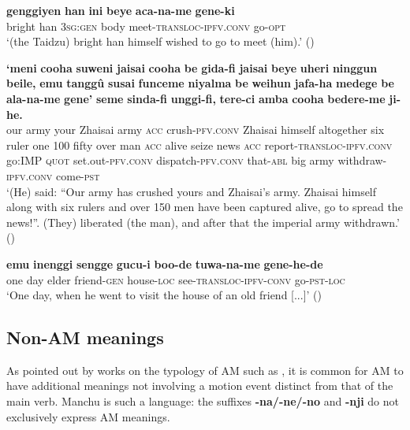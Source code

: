 \documentclass{article}
\newcommand{\ipa}[1]{\textbf{{\phon\mbox{#1}}}} %
\begin{document}
\begin{exe}
\ex \label{ex:acaname.geneki}
\gll
\ipa{genggiyen} 	\ipa{han} 	\ipa{ini} 	\ipa{beye} 	\ipa{aca-na-me} 	\ipa{gene-ki} \\
bright han \textsc{3sg:gen} body meet-\textsc{transloc-ipfv.conv} go-\textsc{opt} \\
\glt ‘(the Taidzu) bright han himself wished to go to meet (him).’ (\citealt[243, 121]{shunjuu92yargiyan})
\end{exe}

\begin{exe}
\ex \label{ex:alaname.gene}
\gll
\ipa{`meni} 	\ipa{cooha} 	\ipa{suweni} 	\ipa{jaisai} 	\ipa{cooha} 	\ipa{be} 	\ipa{gida-fi} 	\ipa{jaisai} 	\ipa{beye} 	\ipa{uheri} 	\ipa{ninggun} 	\ipa{beile,} 	\ipa{emu} 	\ipa{tanggû} 	\ipa{susai} 	\ipa{funceme} 	\ipa{niyalma} 	\ipa{be} 	\ipa{weihun} 	\ipa{jafa-ha} 	\ipa{medege} 	\ipa{be} 	\ipa{ala-na-me} 	\ipa{gene'} 	\ipa{seme} 	\ipa{sinda-fi} 	\ipa{unggi-fi,} 	\ipa{tere-ci} 	\ipa{amba} 	\ipa{cooha} 	\ipa{bedere-me} 	\ipa{ji-he.} \\
our army your Zhaisai army \textsc{acc} crush-\textsc{pfv.conv} Zhaisai himself altogether six ruler one 100 fifty over man \textsc{acc} alive seize news \textsc{acc} report-\textsc{transloc-ipfv.conv} go:\textsc{IMP} \textsc{quot} set.out-\textsc{pfv.conv} dispatch-\textsc{pfv.conv} that-\textsc{abl} big army withdraw-\textsc{ipfv.conv} come-\textsc{pst} \\
\glt ‘(He) said: “Our army has crushed yours and Zhaisai’s army. Zhaisai himself along with six rulers and over 150 men have been captured alive, go to spread the news!”. (They) liberated (the man), and after that the imperial army withdrawn.’ (\citealt[227, 20-21]{shunjuu92yargiyan})
\end{exe}

 \begin{exe}
\ex \label{ex:tuwaname.genehe}
\gll
  \ipa{emu}	\ipa{inenggi}	\ipa{sengge}	\ipa{gucu-i}	\ipa{boo-de}	\ipa{tuwa-na-me}	\ipa{gene-he-de} \\
one day elder friend-\textsc{gen} house-\textsc{loc} see-\textsc{transloc-ipfv-conv} go-\textsc{pst-loc} \\
\glt ‘One day, when he went to visit the house of an old friend [...]’ (\citet[487;784]{stary83sakda})
\end{exe}

\subsection{Non-AM meanings}
As pointed out by works on the typology of AM such as \citet[3]{guillaume16am}, it is common for AM to have additional meanings not involving a motion event distinct from that of the main verb. Manchu is such a language: the suffixes \ipa{-na/-ne/-no} and \ipa{-nji} do not exclusively express AM meanings. 
\end{document}
